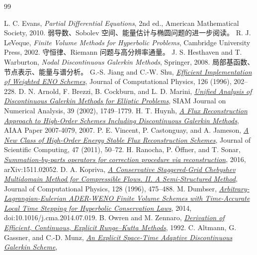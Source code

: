 \cleardoublepage
{}
{}
\begin{thebibliography}{99}
\raggedright
{}
L. C. Evans, \emph{Partial Differential Equations}, 2nd ed., American Mathematical Society, 2010.
弱导数、Sobolev 空间、能量估计与椭圆问题的进一步阅读。
R. J. LeVeque, \emph{Finite Volume Methods for Hyperbolic Problems}, Cambridge University Press, 2002.
守恒律、Riemann 问题与高分辨率通量。
J. S. Hesthaven and T. Warburton, \emph{Nodal Discontinuous Galerkin Methods}, Springer, 2008.
局部基函数、节点表示、能量与谱分析。
G.-S. Jiang and C.-W. Shu,
\href{https://doi.org/10.1006/jcph.1996.0130}{\emph{Efficient Implementation of Weighted ENO Schemes}},
Journal of Computational Physics, 126 (1996), 202--228.
D. N. Arnold, F. Brezzi, B. Cockburn, and L. D. Marini,
\href{https://doi.org/10.1137/S0036142901384162}{\emph{Unified Analysis of Discontinuous Galerkin Methods for Elliptic Problems}},
SIAM Journal on Numerical Analysis, 39 (2002), 1749--1779.
H. T. Huynh,
\href{https://doi.org/10.2514/6.2007-4079}{\emph{A Flux Reconstruction Approach to High-Order Schemes Including Discontinuous Galerkin Methods}},
AIAA Paper 2007-4079, 2007.
P. E. Vincent, P. Castonguay, and A. Jameson,
\href{https://doi.org/10.1007/s10915-010-9420-z}{\emph{A New Class of High-Order Energy Stable Flux Reconstruction Schemes}},
Journal of Scientific Computing, 47 (2011), 50--72.
H. Ranocha, P. \"Offner, and T. Sonar,
\href{https://arxiv.org/abs/1511.02052}{\emph{Summation-by-parts operators for correction procedure via reconstruction}},
2016, arXiv:1511.02052.
D. A. Kopriva,
\href{https://doi.org/10.1006/jcph.1996.0225}{\emph{A Conservative Staggered-Grid Chebyshev Multidomain Method for Compressible Flows. II. A Semi-Structured Method}},
Journal of Computational Physics, 128 (1996), 475--488.
M. Dumbser,
\href{https://arxiv.org/abs/1402.6897}{\emph{Arbitrary-Lagrangian-Eulerian ADER-WENO Finite Volume Schemes with Time-Accurate Local Time Stepping for Hyperbolic Conservation Laws}},
2014, doi:10.1016/j.cma.2014.07.019.
B. Owren and M. Zennaro,
\href{https://doi.org/10.1137/0913084}{\emph{Derivation of Efficient, Continuous, Explicit Runge--Kutta Methods}}, 1992.
C. Altmann, G. Gassner, and C.-D. Munz,
\href{https://congress2.cimne.com/eccomas/proceedings/cfd2010/papers/01008.pdf}{\emph{An Explicit Space-Time Adaptive Discontinuous Galerkin Scheme}},

\end{thebibliography}
